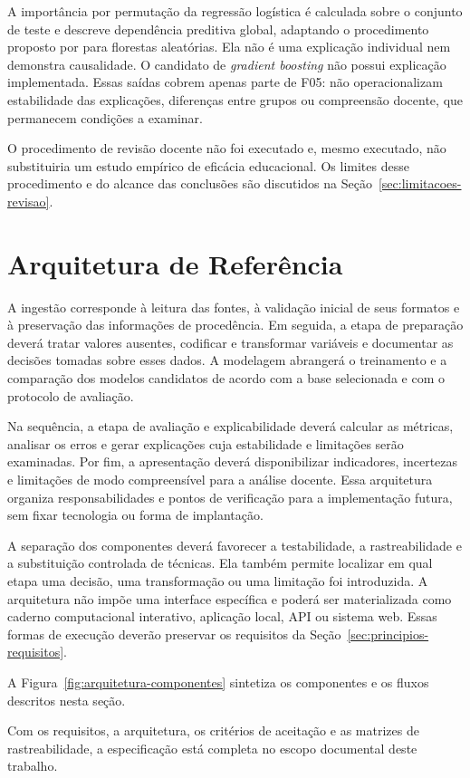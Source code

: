 A importância por permutação da regressão logística é calculada sobre o conjunto de teste e descreve dependência preditiva global, adaptando o procedimento proposto por  para florestas aleatórias. Ela não é uma explicação individual nem demonstra causalidade. O candidato de \textit{gradient boosting} não possui explicação implementada. Essas saídas cobrem apenas parte de F05: não operacionalizam estabilidade das explicações, diferenças entre grupos ou compreensão docente, que permanecem condições a examinar.

O procedimento de revisão docente não foi executado e, mesmo executado, não substituiria um estudo empírico de eficácia educacional. Os limites desse procedimento e do alcance das conclusões são discutidos na Seção~\ref{sec:limitacoes-revisao}.

\section{Arquitetura de Referência}
\label{sec:arquitetura-prototipo}

A ingestão corresponde à leitura das fontes, à validação inicial de seus formatos e à preservação das informações de procedência. Em seguida, a etapa de preparação deverá tratar valores ausentes, codificar e transformar variáveis e documentar as decisões tomadas sobre esses dados. A modelagem abrangerá o treinamento e a comparação dos modelos candidatos de acordo com a base selecionada e com o protocolo de avaliação.

Na sequência, a etapa de avaliação e explicabilidade deverá calcular as métricas, analisar os erros e gerar explicações cuja estabilidade e limitações serão examinadas. Por fim, a apresentação deverá disponibilizar indicadores, incertezas e limitações de modo compreensível para a análise docente. Essa arquitetura organiza responsabilidades e pontos de verificação para a implementação futura, sem fixar tecnologia ou forma de implantação.

A separação dos componentes deverá favorecer a testabilidade, a rastreabilidade e a substituição controlada de técnicas. Ela também permite localizar em qual etapa uma decisão, uma transformação ou uma limitação foi introduzida. A arquitetura não impõe uma interface específica e poderá ser materializada como caderno computacional interativo, aplicação local, API ou sistema web. Essas formas de execução deverão preservar os requisitos da Seção~\ref{sec:principios-requisitos}.

A Figura~\ref{fig:arquitetura-componentes} sintetiza os componentes e os fluxos descritos nesta seção.









Com os requisitos, a arquitetura, os critérios de aceitação e as matrizes de rastreabilidade, a especificação está completa no escopo documental deste trabalho.

